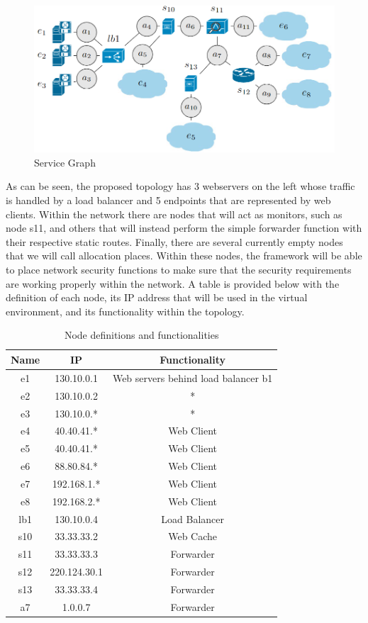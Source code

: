 \begin{figure}[h]  %
    \centering
    \includegraphics[width=1\textwidth]{VPN_AG.PNG} 
    \caption{Service Graph}
    \label{fig:ServiceGraph}
\end{figure}
As can be seen, the proposed topology has 3 webservers on the left whose traffic is handled by a load balancer and 5 endpoints that are represented by web clients. Within the network there are nodes that will act as monitors, such as node s11, and others that will instead perform the simple forwarder function with their respective static routes. Finally, there are several currently empty nodes that we will call allocation places. Within these nodes, the framework will be able to place network security functions to make sure that the security requirements are working properly within the network. A table is provided below with the definition of each node, its IP address that will be used in the virtual environment, and its functionality within the topology.

\begin{table}[h]
    \centering
    \begin{tabular}{ccc}
        \hline
         Name & IP & Functionality \\
        \hline
        e1 & 130.10.0.1 & Web servers behind load balancer b1 \\
        e2 & 130.10.0.2 & * \\
        e3 & 130.10.0.* & * \\
        e4 & 40.40.41.* & Web Client \\ 
        e5 & 40.40.41.* & Web Client \\
        e6 & 88.80.84.* & Web Client \\
        e7 & 192.168.1.* & Web Client \\
        e8 & 192.168.2.* & Web Client \\
        lb1 & 130.10.0.4 & Load Balancer \\
        s10 & 33.33.33.2 & Web Cache \\
        s11 & 33.33.33.3 & Forwarder \\
        s12 & 220.124.30.1 & Forwarder \\
        s13 & 33.33.33.4 & Forwarder \\
        a7 & 1.0.0.7 & Forwarder \\
        \hline
    \end{tabular}
    \caption{Node definitions and functionalities}
    \label{tab:tabella}
\end{table}



